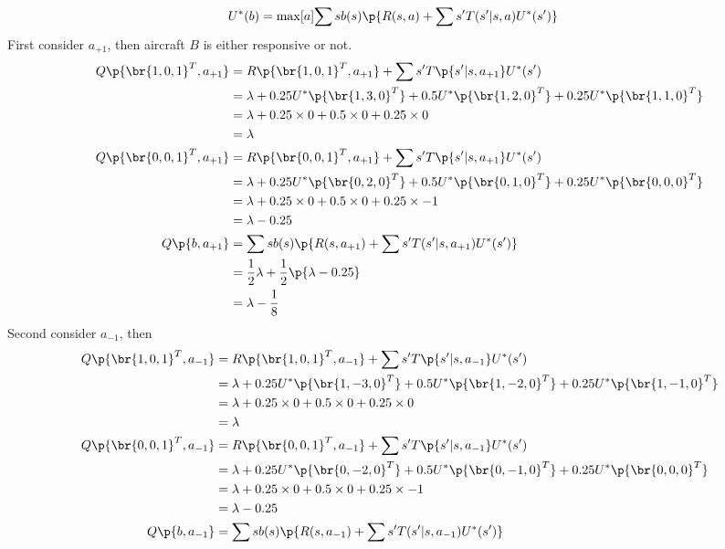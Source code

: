 \documentclass[12pt, oneside]{article}
\begin{document}
\begin{enumerate}
    \begin{align*}
      U^*(b) &= \max[a]{\sum{s}{}{b(s)\p{R(s, a) + \sum{s'}{}{T(s'|s,a)U^*(s')}}}}
    \end{align*}
    First consider $a_{+1}$, then aircraft $B$ is either responsive or not.
    \begin{align*}
      Q\p{\br{1, 0, 1}^T, a_{+1}} &= R\p{\br{1, 0, 1}^T, a_{+1}} + \sum{s'}{}{T\p{s'|s,a_{+1}}U^*(s')} \\
      &= \lambda + 0.25U^*\p{\br{1, 3, 0}^T} + 0.5U^*\p{\br{1, 2, 0}^T} + 0.25U^*\p{\br{1, 1, 0}^T} \\
      &= \lambda + 0.25\times 0 + 0.5\times 0 + 0.25\times 0 \\
      &= \lambda \\
      Q\p{\br{0, 0, 1}^T, a_{+1}} &= R\p{\br{0, 0, 1}^T, a_{+1}} + \sum{s'}{}{T\p{s'|s,a_{+1}}U^*(s')} \\
      &= \lambda + 0.25U^*\p{\br{0, 2, 0}^T} + 0.5U^*\p{\br{0, 1, 0}^T} + 0.25U^*\p{\br{0, 0, 0}^T} \\
      &= \lambda + 0.25\times 0 + 0.5\times 0 + 0.25\times -1 \\
      &= \lambda - 0.25 \\
      Q\p{b, a_{+1}} &= \sum{s}{}{b(s)\p{R(s, a_{+1}) + \sum{s'}{}{T(s'|s,a_{+1})U^*(s')}}} \\
      &= \frac{1}{2}\lambda + \frac{1}{2}\p{\lambda - 0.25} \\
      &= \lambda - \frac{1}{8}
    \end{align*}
    Second consider $a_{-1}$, then
    \begin{align*}
      Q\p{\br{1, 0, 1}^T, a_{-1}} &= R\p{\br{1, 0, 1}^T, a_{-1}} + \sum{s'}{}{T\p{s'|s,a_{-1}}U^*(s')} \\
      &= \lambda + 0.25U^*\p{\br{1, -3, 0}^T} + 0.5U^*\p{\br{1, -2, 0}^T} + 0.25U^*\p{\br{1, -1, 0}^T} \\
      &= \lambda + 0.25\times 0 + 0.5\times 0 + 0.25\times 0 \\
      &= \lambda \\
      Q\p{\br{0, 0, 1}^T, a_{-1}} &= R\p{\br{0, 0, 1}^T, a_{-1}} + \sum{s'}{}{T\p{s'|s,a_{-1}}U^*(s')} \\
      &= \lambda + 0.25U^*\p{\br{0, -2, 0}^T} + 0.5U^*\p{\br{0, -1, 0}^T} + 0.25U^*\p{\br{0, 0, 0}^T} \\
      &= \lambda + 0.25\times 0 + 0.5\times 0 + 0.25\times -1 \\
      &= \lambda - 0.25 \\
      Q\p{b, a_{-1}} &= \sum{s}{}{b(s)\p{R(s, a_{-1}) + \sum{s'}{}{T(s'|s,a_{-1})U^*(s')}}} \\

\end{align*}
\end{enumerate}
\end{document}
